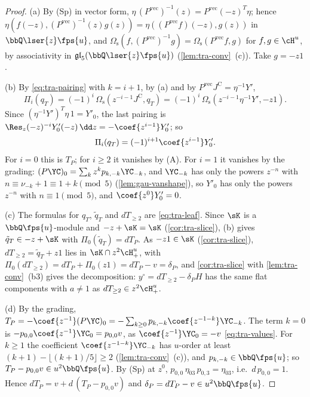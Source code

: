 \begin{proof}
(a) By (Sp) in vector form, $\eta\,(P^{\mathrm{vec}})^{-1}(z) = P^{\mathrm{vec}}(-z)^T\eta$; hence $\eta(f(-z),(P^{\mathrm{vec}})^{-1}(z)g(z)) = \eta((P^{\mathrm{vec}}f)(-z),g(z))$ in $\bbQ\lser{z}\fps{u}$, and $\Omega_{\mathrm s}(f,(P^{\mathrm{vec}})^{-1}g) = \Omega_{\mathrm s}(P^{\mathrm{vec}}f,g)$ for $f,g\in\cH^u$, by associativity in $\mathfrak{gl}_5(\bbQ\lser{z}\fps{u})$ (\cref{lem:tra-conv}~(c)). Take $g = -z1$.

(b) By \eqref{eq:tra-pairing} with $k = i+1$, by (a) and by $P^{\mathrm{vec}}J^{\mathrm C} = \eta^{-1}Y'$,
\[
\Pi_i(q_T) = (-1)^i\,\Omega_{\mathrm s}(z^{-i-1}J^{\mathrm C},q_T) = (-1)^i\,\Omega_{\mathrm s}(z^{-i-1}\eta^{-1}Y',-z1).
\]
Since $(\eta^{-1}Y')^T\eta\,1 = Y'_0$, the last pairing is $\Res_z(-z)^{-i}Y'_0(-z)\,\dd z = -\coef{z^{i-1}}Y'_0$; so
\[
\Pi_i(q_T) = (-1)^{i+1}\coef{z^{i-1}}Y'_0 .
\]
For $i = 0$ this is $T_P$; for $i\geq 2$ it vanishes by (A). For $i = 1$ it vanishes by the grading: $(P\YC)_0 = \sum_kz^kp_{k,-k}\YC_{-k}$, and $\YC_{-k}$ has only the powers $z^{-n}$ with $n\equiv\nu_{-k}+1\equiv 1+k\pmod 5$ (\cref{lem:gau-vanshape}), so $Y'_0$ has only the powers $z^{-n}$ with $n\equiv 1\pmod 5$, and $\coef{z^0}Y'_0 = 0$.

(c) The formulas for $q_T$, $\tilde q_T$ and $dT_{\geq 2}$ are \eqref{eq:tra-leaf}. Since $\sK$ is a $\bbQ\fps{u}$-module and $-z+\sK = \sK$ (\cref{cor:tra-slice}), (b) gives $\tilde q_T\in -z+\sK$ with $\Pi_0(\tilde q_T) = dT_P$. As $-z1\in\sK$ (\cref{cor:tra-slice}), $dT_{\geq 2} = \tilde q_T+z1$ lies in $\sK\cap z^2\cH^u_+$, with $\Pi_0(dT_{\geq 2}) = dT_P+\Pi_0(z1) = dT_P-v = \delta_P$, and \cref{cor:tra-slice} with \cref{lem:tra-conv}~(b3) gives the decomposition: $y^\circ = dT_{\geq 2}-\delta_PH$ has the same flat components with $a\neq 1$ as $dT_{\geq 2}\in z^2\cH^u_+$.

(d) By the grading, $T_P = -\coef{z^{-1}}(P\YC)_0 = -\sum_{k\geq 0}p_{k,-k}\coef{z^{-1-k}}\YC_{-k}$. The term $k = 0$ is $-p_{0,0}\coef{z^{-1}}\YC_0 = p_{0,0}v$, as $\coef{z^{-1}}\YC_0 = -v$ \eqref{eq:tra-values}. For $k\geq 1$ the coefficient $\coef{z^{-1-k}}\YC_{-k}$ has $u$-order at least $(k+1)-\lfloor(k+1)/5\rfloor\geq 2$ (\cref{lem:tra-conv}~(c)), and $p_{k,-k}\in\bbQ\fps{u}$; so $T_P-p_{0,0}v\in u^2\bbQ\fps{u}$. By (Sp) at $z^0$, $p_{0,0}\,\eta_{03}\,p_{0,3} = \eta_{03}$, i.e.\ $d\,p_{0,0} = 1$. Hence $dT_P = v+d\,(T_P-p_{0,0}v)$ and $\delta_P = dT_P-v\in u^2\bbQ\fps{u}$.
\end{proof}

